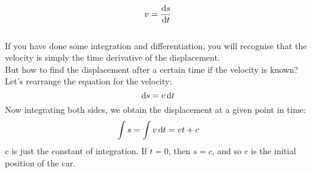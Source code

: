 \begin{equation}
v = \frac{\operatorname{d}\! s}{\operatorname{d}\! t} 
\label{inst_v}
\end{equation}\\
If you have done some integration and differentiation, you will recognise that the velocity is simply the time derivative of the displacement. \nll
{}
\\
But how to find the displacement after a certain time if the velocity is known? Let's rearrange the equation for the velocity:
 \begin{equation}
\operatorname{d}\! s = v \operatorname{d}\! t 
\label{inst_s}
\end{equation}
Now integrating both sides, we obtain the displacement at a given point in time:
  \begin{equation}
\int s = \int v \operatorname{d}\! t = vt + c
\end{equation}
c is just the constant of integration. If $t=0$, then $s=c$, and so c is the initial position of the car.

